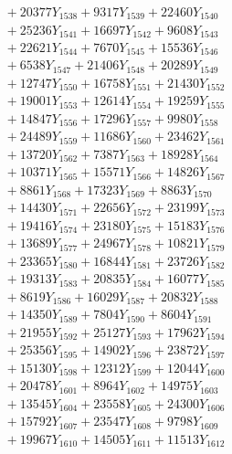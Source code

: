 \documentclass[a4paper,10pt]{article}
\begin{document}
{\begin{align}
&\;  + 20377 Y_{1538} + 9317 Y_{1539} + 22460 Y_{1540} \\[0.3ex]
&\;  + 25236 Y_{1541} + 16697 Y_{1542} + 9608 Y_{1543} \\[0.3ex]
&\;  + 22621 Y_{1544} + 7670 Y_{1545} + 15536 Y_{1546} \\[0.3ex]
&\;  + 6538 Y_{1547} + 21406 Y_{1548} + 20289 Y_{1549} \\[0.3ex]
&\;  + 12747 Y_{1550} + 16758 Y_{1551} + 21430 Y_{1552} \\[0.3ex]
&\;  + 19001 Y_{1553} + 12614 Y_{1554} + 19259 Y_{1555} \\[0.3ex]
&\;  + 14847 Y_{1556} + 17296 Y_{1557} + 9980 Y_{1558} \\[0.5ex]\allowbreak
&\;  + 24489 Y_{1559} + 11686 Y_{1560} + 23462 Y_{1561} \\[0.3ex]
&\;  + 13720 Y_{1562} + 7387 Y_{1563} + 18928 Y_{1564} \\[0.3ex]
&\;  + 10371 Y_{1565} + 15571 Y_{1566} + 14826 Y_{1567} \\[0.3ex]
&\;  + 8861 Y_{1568} + 17323 Y_{1569} + 8863 Y_{1570} \\[0.3ex]
&\;  + 14430 Y_{1571} + 22656 Y_{1572} + 23199 Y_{1573} \\[0.3ex]
&\;  + 19416 Y_{1574} + 23180 Y_{1575} + 15183 Y_{1576} \\[0.3ex]
&\;  + 13689 Y_{1577} + 24967 Y_{1578} + 10821 Y_{1579} \\[0.3ex]
&\;  + 23365 Y_{1580} + 16844 Y_{1581} + 23726 Y_{1582} \\[0.3ex]
&\;  + 19313 Y_{1583} + 20835 Y_{1584} + 16077 Y_{1585} \\[0.3ex]
&\;  + 8619 Y_{1586} + 16029 Y_{1587} + 20832 Y_{1588} \\[0.5ex]\allowbreak
&\;  + 14350 Y_{1589} + 7804 Y_{1590} + 8604 Y_{1591} \\[0.3ex]
&\;  + 21955 Y_{1592} + 25127 Y_{1593} + 17962 Y_{1594} \\[0.3ex]
&\;  + 25356 Y_{1595} + 14902 Y_{1596} + 23872 Y_{1597} \\[0.3ex]
&\;  + 15130 Y_{1598} + 12312 Y_{1599} + 12044 Y_{1600} \\[0.3ex]
&\;  + 20478 Y_{1601} + 8964 Y_{1602} + 14975 Y_{1603} \\[0.3ex]
&\;  + 13545 Y_{1604} + 23558 Y_{1605} + 24300 Y_{1606} \\[0.3ex]
&\;  + 15792 Y_{1607} + 23547 Y_{1608} + 9798 Y_{1609} \\[0.3ex]
&\;  + 19967 Y_{1610} + 14505 Y_{1611} + 11513 Y_{1612} \\[0.3ex]

\end{align}}
\end{document}
